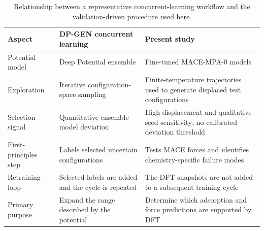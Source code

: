 \begin{table}[!htbp]
  \centering
  \small
  \caption{Relationship between a representative concurrent-learning workflow
  and the validation-driven procedure used here.}
  \label{tab:si_concurrent_learning}
  \setlength{\tabcolsep}{4pt}
  \begin{tabular}{>{\raggedright\arraybackslash}p{2.0cm}>{\raggedright\arraybackslash}p{5.0cm}>{\raggedright\arraybackslash}p{7.1cm}}
    \toprule
    Aspect & DP-GEN concurrent learning & Present study \\
    \midrule
    Potential model & Deep Potential ensemble & Fine-tuned MACE-MPA-0 models \\
    Exploration & Iterative configuration-space sampling & Finite-temperature
    trajectories used to generate displaced test configurations \\
    Selection signal & Quantitative ensemble model deviation & High displacement
    and qualitative seed sensitivity; no calibrated deviation threshold \\
    First-principles step & Labels selected uncertain configurations & Tests MACE
    forces and identifies chemistry-specific failure modes \\
    Retraining loop & Selected labels are added and the cycle is repeated & The DFT
    snapshots are not added to a subsequent training cycle \\
    Primary purpose & Expand the range described by the potential & Determine
    which adsorption and force predictions are supported by DFT \\
    \bottomrule
  \end{tabular}
\end{table}
